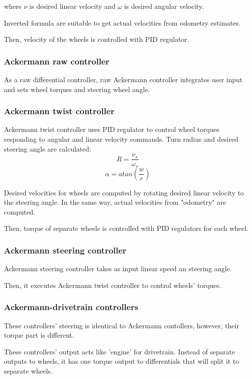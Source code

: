 \documentclass[a4paper,11pt]{article}
\begin{document}
where $\nu$ is desired linear velocity and $\omega$ is desired angular velocity.


Inverted formula are suitable to get actual velocities from odometry estimates.


Then, velocity of the wheels is controlled with PID regulator.

\subsubsection{Ackermann raw controller}

As a raw differential controller, raw Ackermann controller integrates user input and sets wheel torques and steering wheel angle.

\subsubsection{Ackermann twist controller}

Ackermann twist controller uses PID regulator to control wheel torques responding to angular and linear velocity commands. 
Turn radius and desired steering angle are calculated: 
$$
R = \frac{\nu_s}{\omega_s}
$$
$$
\alpha = atan(\frac{w}{r})
$$

Desired velocities for wheels are computed by rotating desired linear velocity to the steering angle. 
In the same way, actual velocities from "odometry" are computed.

Then, torque of separate wheels is controlled with PID regulators for each wheel.

\subsubsection{Ackermann steering controller}

Ackermann steering controller takes as input linear speed an steering angle. 

Then, it executes Ackermann twist controller to control wheels' torques. 

\subsubsection{Ackermann-drivetrain controllers}

These controllers' steering is identical to Ackermann contollers, however, their torque part is different. 

These controllers' output acts like 'engine' for drivetrain. Instead of separate outputs to wheels, it has one torque output to differentials that will split it to separate wheels. 

\nocite{*}


\end{document}
